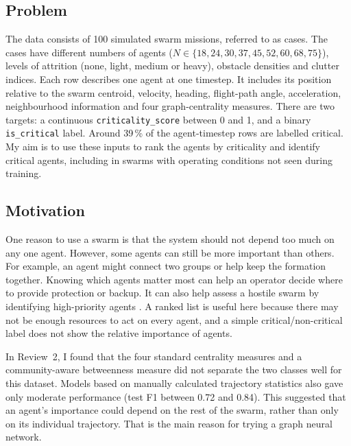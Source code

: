 \documentclass[11pt,a4paper]{article}
\begin{document}
\subsection{Problem}
The data consists of 100 simulated swarm missions, referred to as cases. The cases have different numbers of agents
($N\in\{18,24,30,37,45,52,60,68,75\}$), levels of attrition (none, light, medium or heavy), obstacle densities and clutter indices.
Each row describes one agent at one timestep. It includes its position relative to the swarm centroid, velocity, heading,
flight-path angle, acceleration, neighbourhood information and four graph-centrality measures. There are two targets:
a continuous \texttt{criticality\_score} between 0 and 1, and a binary \texttt{is\_critical} label. Around 39\,\% of the
agent-timestep rows are labelled critical. My aim is to use these inputs to rank the agents by criticality and identify
critical agents, including in swarms with operating conditions not seen during training.

\FloatBarrier
\subsection{Motivation}
One reason to use a swarm is that the system should not depend too much on any one agent. However, some agents can still
be more important than others. For example, an agent might connect two groups or help keep the formation together.
Knowing which agents matter most can help an operator decide where to provide protection or backup. It can also help
assess a hostile swarm by identifying high-priority agents \cite{teng2024drones}. A ranked list is useful here because
there may not be enough resources to act on every agent, and a simple critical/non-critical label does not show the
relative importance of agents.

In Review~2, I found that the four standard centrality measures and a community-aware betweenness measure did not
separate the two classes well for this dataset. Models based on manually calculated trajectory statistics also gave
only moderate performance (test F1 between 0.72 and 0.84). This suggested that an agent's importance could depend on
the rest of the swarm, rather than only on its individual trajectory. That is the main reason for trying a graph neural network.

\FloatBarrier
\end{document}
